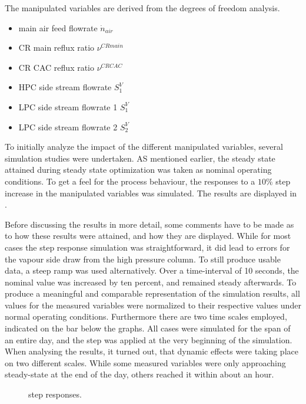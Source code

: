         The manipulated variables are derived from the degrees of freedom analysis.
        \begin{itemize}
            \item main air feed flowrate $\dot{n}_{air}$
            \item CR main reflux ratio $\nu^{CR main}$
            \item CR CAC reflux ratio $\nu^{CR CAC}$
            \item HPC side stream flowrate $S^V_1$
            \item LPC side stream flowrate 1 $S^V_1$
            \item LPC side stream flowrate 2 $S^V_2$
        \end{itemize}
        
        To initially analyze the impact of the different manipulated variables, several simulation studies were undertaken. 
        AS mentioned earlier, the steady state attained during steady state optimization was taken as nominal operating 
        conditions. To get a feel for the process behaviour, the responses to a $10 \%$ step increase in the manipulated 
        variables was simulated. The results are displayed in .
        
        Before discussing the results in more detail, some comments have to be made as to how these results were attained, 
        and how they are displayed. While for most cases the step response simulation was
        straightforward, it did lead to errors for the vapour side draw from the high pressure column. To still produce usable 
        data, a steep ramp was used alternatively. Over a time-interval of 10 seconds, the nominal value was increased  by 
        ten percent, and remained steady afterwards. To produce a meaningful and comparable representation of the simulation 
        results, all values for the measured variables were normalized to their respective values under normal operating conditions. 
        Furthermore there are two time scales employed, indicated on the bar below the graphs. All cases were simulated for the span 
        of an entire day, and the step was applied at the very beginning of the simulation. When analysing the results, it turned out, 
        that dynamic effects were taking place on two different scales. While some measured variables were only approaching steady-state
        at the end of the day, others reached it within about an hour. 
        
        \begin{landscape}
            \begin{figure}
                \center
                
                \caption{step responses.}
                \label{fig:opt:stepresp}
            \end{figure}
        \end{landscape}
        
